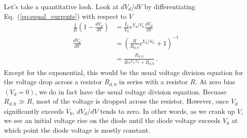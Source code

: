 \documentclass{article}
\begin{document}
Let's take a quantitative look.
Look at $dV_d / dV$ by differentiating Eq.~(\ref{eq:equal_currents}) with respect to $V$
\begin{align}
  \frac{1}{R} \left( 1 - \frac{dV_d}{dV} \right) &= \frac{I_0}{V_0} e^{V_d / V_{0}} \frac{dV_d}{dV} \nonumber \\
  \frac{d V_d}{dV}
  &= \left( \frac{R}{R_{d,0}} e^{V_d / V_0} + 1 \right)^{-1} \nonumber \\
  &= \frac{R_{d,0}}{R \, e^{V_d / V_0} + R_{d,0}} \nonumber
  \, .
\end{align}
Except for the exponential, this would be the usual voltage division equation for the voltage drop across a resistor $R_{d,0}$ in series with a resistor $R$.
At zero bias $(V_d = 0)$, we do in fact have the usual voltage division equation.
Becuase $R_{d,0} \gg R$, most of the voltage is dropped across the resistor.
However, once $V_d$ significantly exceeds $V_0$, $dV_d / dV$ tends to zero.
In other words, as we crank up $V$, we see an initial voltage rise on the diode until the diode voltage exceeds $V_0$ at which point the diode voltage is mostly constant.
\end{document}
